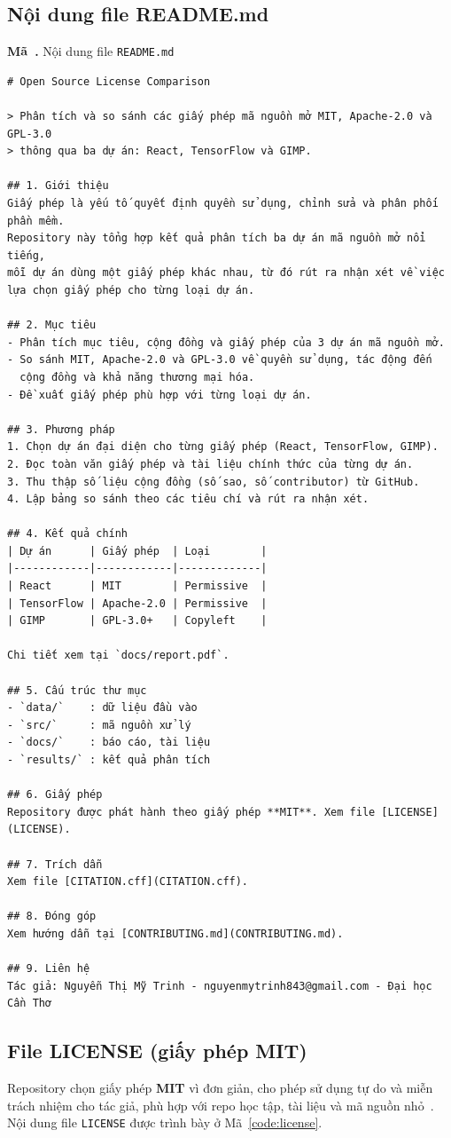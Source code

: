 \documentclass[12pt,a4paper]{article}
\newcounter{code}
\newcommand{\codecap}[2]{\refstepcounter{code}\label{#2}\par\vspace{4pt}\noindent\textbf{Mã~\thecode.} #1\par\nopagebreak\vspace{2pt}}
\newcommand{\fn}[1]{\texttt{#1}}
\begin{document}
\subsection{Nội dung file README.md}\label{sec:readme}
\codecap{Nội dung file \fn{README.md}}{code:readme}
\begin{Verbatim}
# Open Source License Comparison

> Phân tích và so sánh các giấy phép mã nguồn mở MIT, Apache-2.0 và GPL-3.0
> thông qua ba dự án: React, TensorFlow và GIMP.

## 1. Giới thiệu
Giấy phép là yếu tố quyết định quyền sử dụng, chỉnh sửa và phân phối phần mềm.
Repository này tổng hợp kết quả phân tích ba dự án mã nguồn mở nổi tiếng,
mỗi dự án dùng một giấy phép khác nhau, từ đó rút ra nhận xét về việc
lựa chọn giấy phép cho từng loại dự án.

## 2. Mục tiêu
- Phân tích mục tiêu, cộng đồng và giấy phép của 3 dự án mã nguồn mở.
- So sánh MIT, Apache-2.0 và GPL-3.0 về quyền sử dụng, tác động đến
  cộng đồng và khả năng thương mại hóa.
- Đề xuất giấy phép phù hợp với từng loại dự án.

## 3. Phương pháp
1. Chọn dự án đại diện cho từng giấy phép (React, TensorFlow, GIMP).
2. Đọc toàn văn giấy phép và tài liệu chính thức của từng dự án.
3. Thu thập số liệu cộng đồng (số sao, số contributor) từ GitHub.
4. Lập bảng so sánh theo các tiêu chí và rút ra nhận xét.

## 4. Kết quả chính
| Dự án      | Giấy phép  | Loại        |
|------------|------------|-------------|
| React      | MIT        | Permissive  |
| TensorFlow | Apache-2.0 | Permissive  |
| GIMP       | GPL-3.0+   | Copyleft    |

Chi tiết xem tại `docs/report.pdf`.

## 5. Cấu trúc thư mục
- `data/`    : dữ liệu đầu vào
- `src/`     : mã nguồn xử lý
- `docs/`    : báo cáo, tài liệu
- `results/` : kết quả phân tích

## 6. Giấy phép
Repository được phát hành theo giấy phép **MIT**. Xem file [LICENSE](LICENSE).

## 7. Trích dẫn
Xem file [CITATION.cff](CITATION.cff).

## 8. Đóng góp
Xem hướng dẫn tại [CONTRIBUTING.md](CONTRIBUTING.md).

## 9. Liên hệ
Tác giả: Nguyễn Thị Mỹ Trinh - nguyenmytrinh843@gmail.com - Đại học Cần Thơ
\end{Verbatim}

\subsection{File LICENSE (giấy phép MIT)}\label{sec:license}
Repository chọn giấy phép \textbf{MIT} vì đơn giản, cho phép sử dụng tự do và miễn trách nhiệm cho tác giả, phù hợp với repo học tập, tài liệu và mã nguồn nhỏ~\cite{mit}. Nội dung file \fn{LICENSE} được trình bày ở Mã~\ref{code:license}.
\end{document}
